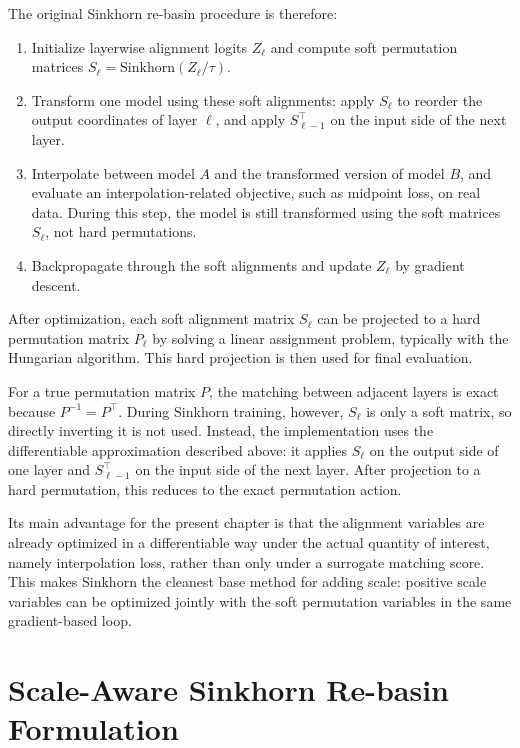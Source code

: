 \documentclass[11pt,a4paper]{report}
\begin{document}
The original Sinkhorn re-basin procedure is therefore:
\begin{enumerate}
    \item Initialize layerwise alignment logits \(Z_\ell\) and compute soft permutation matrices \(S_\ell=\mathrm{Sinkhorn}(Z_\ell/\tau)\).
    \item Transform one model using these soft alignments: apply \(S_\ell\) to reorder the output coordinates of layer \(\ell\), and apply \(S_{\ell-1}^{\top}\) on the input side of the next layer.
    \item Interpolate between model \(A\) and the transformed version of model \(B\), and evaluate an interpolation-related objective, such as midpoint loss, on real data. During this step, the model is still transformed using the soft matrices \(S_\ell\), not hard permutations.
    \item Backpropagate through the soft alignments and update \(Z_\ell\) by gradient descent.
\end{enumerate}

After optimization, each soft alignment matrix \(S_\ell\) can be projected to a hard permutation matrix \(P_\ell\) by solving a linear assignment problem, typically with the Hungarian algorithm. This hard projection is then used for final evaluation.

For a true permutation matrix \(P\), the matching between adjacent layers is exact because \(P^{-1}=P^\top\). During Sinkhorn training, however, \(S_\ell\) is only a soft matrix, so directly inverting it is not used. Instead, the implementation uses the differentiable approximation described above: it applies \(S_\ell\) on the output side of one layer and \(S_{\ell-1}^{\top}\) on the input side of the next layer. After projection to a hard permutation, this reduces to the exact permutation action.

Its main advantage for the present chapter is that the alignment variables are already optimized in a differentiable way under the actual quantity of interest, namely interpolation loss, rather than only under a surrogate matching score. This makes Sinkhorn the cleanest base method for adding scale: positive scale variables can be optimized jointly with the soft permutation variables in the same gradient-based loop.

\section{Scale-Aware Sinkhorn Re-basin Formulation}
\label{sec:scale_aware_sinkhorn}
\end{document}
